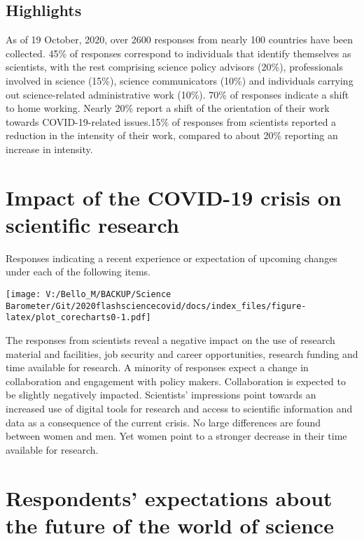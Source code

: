 \documentclass[
]{article}
\begin{document}
\hypertarget{highlights}{%
\subsection{\texorpdfstring{\textbf{Highlights}}{Highlights}}\label{highlights}}

As of 19 October, 2020, over 2600 responses from nearly 100 countries
have been collected. 45\% of responses correspond to individuals that
identify themselves as scientists, with the rest comprising science
policy advisors (20\%), professionals involved in science (15\%),
science communicators (10\%) and individuals carrying out
science-related administrative work (10\%). 70\% of responses indicate a
shift to home working. Nearly 20\% report a shift of the orientation of
their work towards COVID-19-related issues.15\% of responses from
scientists reported a reduction in the intensity of their work, compared
to about 20\% reporting an increase in intensity.

\hypertarget{impact-of-the-covid-19-crisis-on-scientific-research}{%
\section{\texorpdfstring{\textbf{Impact of the COVID-19 crisis on
scientific
research}}{Impact of the COVID-19 crisis on scientific research}}\label{impact-of-the-covid-19-crisis-on-scientific-research}}

Responses indicating a recent experience or expectation of upcoming
changes under each of the following items.

\texttt{[image: V:/Bello\_M/BACKUP/Science Barometer/Git/2020flashsciencecovid/docs/index\_files/figure-latex/plot\_corecharts0-1.pdf]}

The responses from scientists reveal a negative impact on the use of
research material and facilities, job security and career opportunities,
research funding and time available for research. A minority of
responses expect a change in collaboration and engagement with policy
makers. Collaboration is expected to be slightly negatively impacted.
Scientists' impressions point towards an increased use of digital tools
for research and access to scientific information and data as a
consequence of the current crisis. No large differences are found
between women and men. Yet women point to a stronger decrease in their
time available for research.

\hypertarget{respondents-expectations-about-the-future-of-the-world-of-science}{%
\section{\texorpdfstring{\textbf{Respondents' expectations about the
future of the world of
science}}{Respondents' expectations about the future of the world of science}}\label{respondents-expectations-about-the-future-of-the-world-of-science}}
\end{document}
